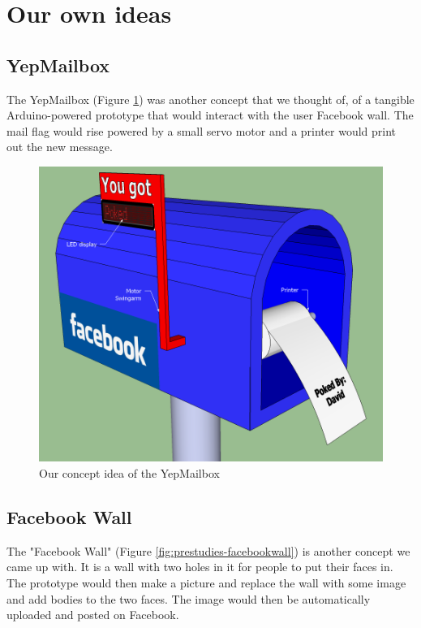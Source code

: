 \newpage

\section{Our own ideas}

\subsection{YepMailbox}
The YepMailbox (Figure \ref{fig:prestudies-YepMailbox}) was another concept that we thought of, of a tangible Arduino-powered prototype 
that would interact with the user Facebook wall. The mail flag would rise powered by a small servo motor and a printer 
would print out the new message.

\begin{figure}[h!]
\centering \includegraphics[scale=0.4]{img/prestudies-YepMailbox}
\caption{Our concept idea of the YepMailbox}
\label{fig:prestudies-YepMailbox}
\end{figure}

\newpage

\subsection{Facebook Wall}
The "Facebook Wall" (Figure \ref{fig:prestudies-facebookwall}) is another concept we came up with. It is a wall with two holes in it for people to put their faces in.
The prototype would then make a picture and replace the wall with some image and add bodies to the two faces. The image 
would then be automatically uploaded and posted on Facebook.

